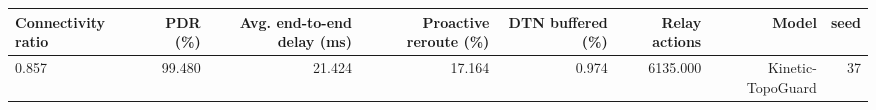 \begin{tabular}{lrrrrrrr}
\toprule
Connectivity ratio & PDR (\%) & Avg. end-to-end delay (ms) & Proactive reroute (\%) & DTN buffered (\%) & Relay actions & Model & seed \\
\midrule
0.857 & 99.480 & 21.424 & 17.164 & 0.974 & 6135.000 & Kinetic-TopoGuard & 37 \\
\bottomrule
\end{tabular}